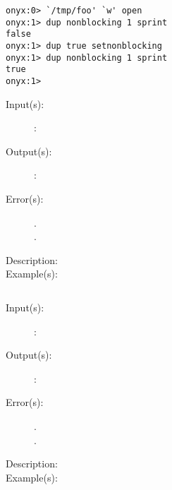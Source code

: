 \begin{description}
\begin{description}
\begin{verbatim}
onyx:0> `/tmp/foo' `w' open
onyx:1> dup nonblocking 1 sprint
false
onyx:1> dup true setnonblocking
onyx:1> dup nonblocking 1 sprint
true
onyx:1>
		\end{verbatim}
	\end{description}
\label{systemdict:setpgid}
\item[{\onyxop{OPARGS}{setpgid}{OPOUTS}}: ]
	\begin{description}\item[]
	\item[Input(s): ]
		\begin{description}\item[]
		\item[: ]
		\end{description}
	\item[Output(s): ]
		\begin{description}\item[]
		\item[: ]
		\end{description}
	\item[Error(s): ]
		\begin{description}\item[]
		\item[.]
		\item[.]
		\end{description}
	\item[Description: ]
	\item[Example(s): ]\begin{verbatim}

		\end{verbatim}
	\end{description}
\label{systemdict:setsid}
\item[{\onyxop{OPARGS}{setsid}{OPOUTS}}: ]
	\begin{description}\item[]
	\item[Input(s): ]
		\begin{description}\item[]
		\item[: ]
		\end{description}
	\item[Output(s): ]
		\begin{description}\item[]
		\item[: ]
		\end{description}
	\item[Error(s): ]
		\begin{description}\item[]
		\item[.]
		\item[.]
		\end{description}
	\item[Description: ]
	\item[Example(s): ]\begin{verbatim}


\end{verbatim}
\end{description}
\end{description}
